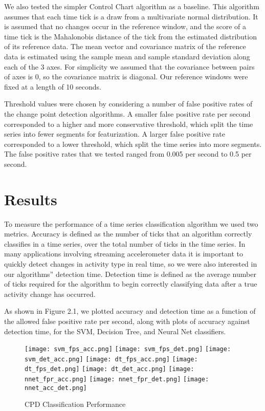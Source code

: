 We also tested the simpler Control Chart algorithm as a baseline. This
algorithm assumes that each time tick is a draw from a multivariate normal distribution.
It is assumed that no changes occur in the reference window, and the score of a time
tick is the Mahalonobis distance of the tick from the estimated distribution of its reference data.
The mean vector and covariance matrix of the reference data is estimated using
the sample mean and sample standard deviation along each of the 3 axes. For simplicity
we assumed that the covariance between pairs of axes is 0, so the covariance matrix is
diagonal. Our reference windows were fixed at a length of 10 seconds. 

Threshold values were chosen by considering a number of false positive rates of
the change point detection algorithms. A smaller false positive rate per second
corresponded to a higher and more conservative threshold, which split the
time series into fewer segments for featurization. A larger false positive rate
corresponded to a lower threshold, which split the time series into more segments.
The false positive rates that we tested ranged from 0.005 per second to 0.5 per second.

\section{Results}
To measure the performance of a time series classification algorithm we used
two metrics. Accuracy is defined as the number of
ticks that an algorithm correctly classifies in a time series, over the total number of ticks
in the time series. In many applications involving streaming accelerometer data
it is important to quickly detect changes in activity type in real time, so we
were also interested in our algorithms'' detection time.
Detection time is defined as the average number of ticks
required for the algorithm to begin correctly classifying data after a
true activity change has occurred.

As shown in Figure 2.1, we plotted accuracy and detection time as a function of the allowed
false positive rate per second, along with plots of accuracy against detection
time, for the SVM, Decision Tree, and Neural Net classifiers.

\begin{figure}
 \centering
 \texttt{[image: svm\_fps\_acc.png]}
 \texttt{[image: svm\_fps\_det.png]}
 \texttt{[image: svm\_det\_acc.png]}
 \texttt{[image: dt\_fps\_acc.png]}
 \texttt{[image: dt\_fps\_det.png]}
 \texttt{[image: dt\_det\_acc.png]}
 \texttt{[image: nnet\_fpr\_acc.png]}
 \texttt{[image: nnet\_fpr\_det.png]}
 \texttt{[image: nnet\_acc\_det.png]}
 \caption{CPD Classification Performance}
\end{figure}
